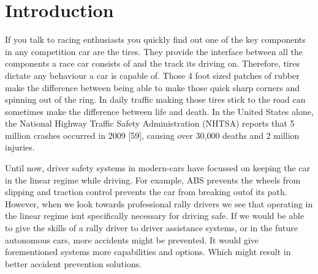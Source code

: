 \section{Introduction}
If you talk to racing enthusiasts you quickly find out one of the key components in any competition car are the tires. They provide the interface between all the components a race car consists of and the track it\textquotesingle s driving on. Therefore, tires dictate any behaviour a car is capable of. Those 4 foot sized patches of rubber make the difference between being able to make those quick sharp corners and spinning out of the ring. In daily traffic making those tires stick to the road can sometimes make the difference between life and death. In the United States alone, the National Highway Traffic Safety Administration (NHTSA) reports that 5 million crashes occurred in 2009 [59], causing over 30,000 deaths and 2 million injuries. 

Until now, driver safety systems in modern-cars have focussed on keeping the car in the linear regime while driving. For example, ABS prevents the wheels from slipping and traction control prevents the car from \textquotesingle breaking out\textquotesingle  of its path. However, when we look towards professional rally drivers we see that operating in the linear regime isn\textquotesingle t specifically necessary for driving safe. If we would be able to give the skills of a rally driver to driver assistance systems, or in the future autonomous cars, more accidents might be prevented. It would give forementioned systems more capabilities and options. Which might result in better accident prevention solutions.

